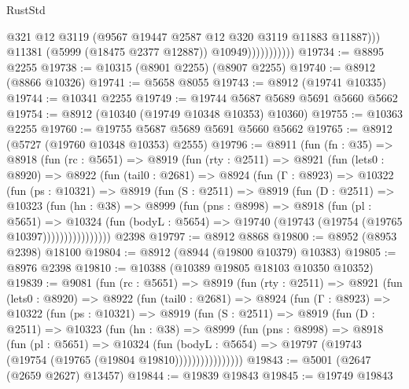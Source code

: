 \begin{lexlean}{RustStd}
\begin{coremodule}
                              @321
                              @12
                              @3119
                              (@9567 @19447 @2587 @12 @320 @3119 @11883 @11887)))
                          @11381
                          (@5999 (@18475 @2377 @12887))
                          @10949)))))))))))
@19734 := @8895 @2255
@19738 := @10315 (@8901 @2255) (@8907 @2255)
@19740 := @8912 (@8866 @10326)
@19741 := @5658 @8055
@19743 := @8912 (@19741 @10335)
@19744 := @10341 @2255
@19749 := @19744 @5687 @5689 @5691 @5660 @5662
@19754 := @8912 (@10340 (@19749 @10348 @10353) @10360)
@19755 := @10363 @2255
@19760 := @19755 @5687 @5689 @5691 @5660 @5662
@19765 := @8912 (@5727 (@19760 @10348 @10353) @2555)
@19796 := @8911
    (fun (fn : @35) =>
    @8918
      (fun (rc : @5651) =>
      @8919
        (fun (rty : @2511) =>
        @8921
          (fun (lets0 : @8920) =>
          @8922
            (fun (tail0 : @2681) =>
            @8924
              (fun (Γ : @8923) =>
              @10322
                (fun (ps : @10321) =>
                @8919
                  (fun (S : @2511) =>
                  @8919
                    (fun (D : @2511) =>
                    @10323
                      (fun (hn : @38) =>
                      @8999
                        (fun (pns : @8998) =>
                        @8918
                          (fun (pl : @5651) =>
                          @10324
                            (fun (bodyL : @5654) =>
                            @19740 (@19743 (@19754 (@19765 @10397))))))))))))))))
    @2398
@19797 := @8912 @8868
@19800 := @8952 (@8953 @2398) @18100
@19804 := @8912 (@8944 (@19800 @10379) @10383)
@19805 := @8976 @2398
@19810 := @10388 (@10389 @19805 @18103 @10350 @10352)
@19839 := @9081
    (fun (rc : @5651) =>
    @8919
      (fun (rty : @2511) =>
      @8921
        (fun (lets0 : @8920) =>
        @8922
          (fun (tail0 : @2681) =>
          @8924
            (fun (Γ : @8923) =>
            @10322
              (fun (ps : @10321) =>
              @8919
                (fun (S : @2511) =>
                @8919
                  (fun (D : @2511) =>
                  @10323
                    (fun (hn : @38) =>
                    @8999
                      (fun (pns : @8998) =>
                      @8918
                        (fun (pl : @5651) =>
                        @10324
                          (fun (bodyL : @5654) =>
                          @19797 (@19743 (@19754 (@19765 (@19804 @19810))))))))))))))))
@19843 := @5001 (@2647 (@2659 @2627) @13457)
@19844 := @19839 @19843
@19845 := @19749 @19843

\end{coremodule}
\end{lexlean}
